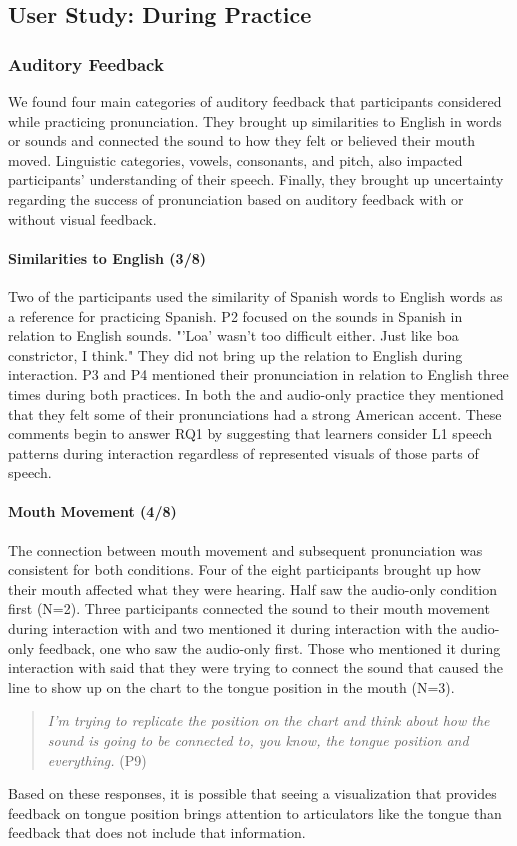 
\subsection{User Study: During Practice}
\subsubsection{Auditory Feedback}
\label{sec:AudFeed}
We found four main categories of auditory feedback that participants considered while practicing pronunciation. They brought up similarities to English in words or sounds and connected the sound to how they felt or believed their mouth moved. Linguistic categories, vowels, consonants, and pitch, also impacted participants' understanding of their speech. Finally, they brought up uncertainty regarding the success of pronunciation based on auditory feedback with or without visual feedback.

\paragraph{Similarities to English (3/8)}
Two of the participants used the similarity of Spanish words to English words as a reference for practicing Spanish. P2 focused on the sounds in Spanish in relation to English sounds. "'Loa' wasn't too difficult either. Just like boa constrictor, I think." They did not bring up the relation to English during \visowel{} interaction. P3 and P4 mentioned their pronunciation in relation to English three times during both practices. In both the \visowel{} and audio-only practice they mentioned that they felt some of their pronunciations had a strong American accent. These comments begin to answer RQ1 by suggesting that learners consider L1 speech patterns during interaction regardless of represented visuals of those parts of speech.

\paragraph{Mouth Movement (4/8)}
The connection between mouth movement and subsequent pronunciation was consistent for both conditions. Four of the eight participants brought up how their mouth affected what they were hearing. Half saw the audio-only condition first (N=2). Three participants connected the sound to their mouth movement during interaction with \visowel{} and two mentioned it during interaction with the audio-only feedback, one who saw the audio-only first. Those who mentioned it during interaction with \visowel{} said that they were trying to connect the sound that caused the line to show up on the chart to the tongue position in the mouth (N=3). 
\begin{quote}
    \textit{I'm trying to replicate the position on the chart and think about how the sound is going to be connected to, you know, the tongue position and everything.} (P9)
\end{quote}
Based on these responses, it is possible that seeing a visualization that provides feedback on tongue position brings attention to articulators like the tongue than feedback that does not include that information. 

